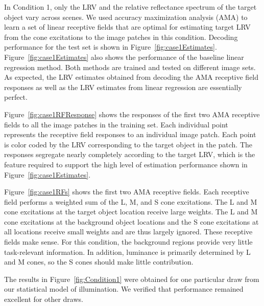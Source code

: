 \documentclass{jov}
\begin{document}
In Condition 1, only the LRV and the relative reflectance spectrum of the target object vary across scenes.
We used accuracy maximization analysis (AMA) to learn a set of linear receptive fields that are optimal for estimating target LRV from the cone excitations to the image patches in this condition. 
Decoding performance for the test set is shown in Figure~\ref{fig:case1Estimates}. 
Figure~\ref{fig:case1Estimates} also shows the performance of the baseline linear regression method. 
Both methods are trained and tested on different image sets.
As expected, the LRV estimates obtained from decoding the AMA receptive field responses as well as the LRV estimates from linear regression are essentially perfect.

Figure~\ref{fig:case1RFResponse} shows the responses of the first two AMA receptive fields to all the image patches in the training set.
Each individual point represents the receptive field responses to an individual image patch.
Each point is color coded by the LRV corresponding to the target object in the patch.
The responses segregate nearly completely according to the target LRV, which is the feature required to support the high level 
of estimation performance shown in Figure~\ref{fig:case1Estimates}.

Figure~\ref{fig:case1RFs} shows the first two AMA receptive fields.
Each receptive field performs a weighted sum of the L, M, and S cone excitations.
The L and M cone excitations at the target object location receive large weights.
The L and M cone excitations at the background object locations and the S cone excitations at all locations receive small weights and are thus largely ignored. 
These receptive fields make sense.
For this condition, the background regions provide very little task-relevant information. 
In addition, luminance is primarily determined by L and M cones, so the S cones should make little
contribution.

The results in Figure~\ref{fig:Condition1} were obtained for one particular draw from our statistical model of illumination.
We verified that performance remained excellent for other draws.
\end{document}
